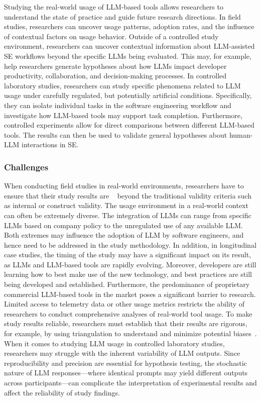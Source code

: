 Studying the real-world usage of LLM-based tools allows researchers to understand the state of practice and guide future research directions.
In field studies, researchers can uncover usage patterns, adoption rates, and the influence of contextual factors on usage behavior.
Outside of a controlled study environment, researchers can uncover contextual information about LLM-assisted SE workflows beyond the specific LLMs being evaluated.
This may, for example, help researchers generate hypotheses about how LLMs impact developer productivity, collaboration, and decision-making processes.
In controlled laboratory studies, researchers can study specific phenomena related to LLM usage under carefully regulated, but potentially artificial conditions.
Specifically, they can isolate individual tasks in the software engineering workflow and investigate how LLM-based tools may support task completion.
Furthermore, controlled experiments allow for direct comparisons between different LLM-based tools.
The results can then be used to validate general hypotheses about human-LLM interactions in SE.

\subsubsection{Challenges}

When conducting field studies in real-world environments, researchers have to ensure that their study results are ~\cite{Sullivan2011-ub} beyond the traditional validity criteria such as internal or construct validity.
The usage environment in a real-world context can often be extremely diverse.
The integration of LLMs can range from specific LLMs based on company policy to the unregulated use of any available LLM. 
Both extremes may influence the adoption of LLM by software engineers, and hence need to be addressed in the study methodology.
In addition, in longitudinal case studies, the timing of the study may have a significant impact on its result, as LLMs and LLM-based tools are rapidly evolving.
Moreover, developers are still learning how to best make use of the new technology, and best practices are still being developed and established.
Furthermore, the predominance of proprietary commercial LLM-based tools in the market poses a significant barrier to research.
Limited access to telemetry data or other usage metrics restricts the ability of researchers to conduct comprehensive analyses of real-world tool usage.
To make study results reliable, researchers must establish that their results are rigorous, for example, by using triangulation to understand and minimize potential biases~\cite{Sullivan2011-ub}.
When it comes to studying LLM usage in controlled laboratory studies, researchers may struggle with the inherent variability of LLM outputs.
Since reproducibility and precision are essential for hypothesis testing, the stochastic nature of LLM responses---where identical prompts may yield different outputs across participants---can complicate the interpretation of experimental results and affect the reliability of study findings.

